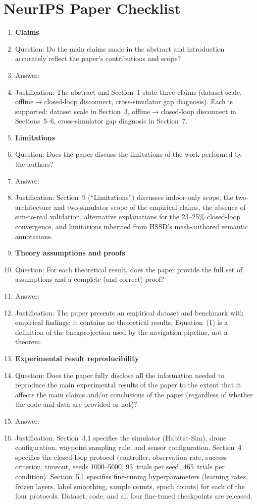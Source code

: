 \section*{NeurIPS Paper Checklist}

\begin{enumerate}

\item {\bf Claims}
    \item[] Question: Do the main claims made in the abstract and introduction accurately reflect the paper's contributions and scope?
    \item[] Answer: \answerYes{}
    \item[] Justification: The abstract and Section~1 state three claims (dataset scale, offline$\rightarrow$closed-loop disconnect, cross-simulator gap diagnosis). Each is supported: dataset scale in Section~3, offline$\rightarrow$closed-loop disconnect in Sections~5--6, cross-simulator gap diagnosis in Section~7.
\item {\bf Limitations}
    \item[] Question: Does the paper discuss the limitations of the work performed by the authors?
    \item[] Answer: \answerYes{}
    \item[] Justification: Section~9 (``Limitations'') discusses indoor-only scope, the two-architecture and two-simulator scope of the empirical claims, the absence of sim-to-real validation, alternative explanations for the 23--25\% closed-loop convergence, and limitations inherited from HSSD's mesh-authored semantic annotations.
\item {\bf Theory assumptions and proofs}
    \item[] Question: For each theoretical result, does the paper provide the full set of assumptions and a complete (and correct) proof?
    \item[] Answer: \answerNA{}
    \item[] Justification: The paper presents an empirical dataset and benchmark with empirical findings; it contains no theoretical results. Equation~(1) is a definition of the backprojection used by the navigation pipeline, not a theorem.
    \item {\bf Experimental result reproducibility}
    \item[] Question: Does the paper fully disclose all the information needed to reproduce the main experimental results of the paper to the extent that it affects the main claims and/or conclusions of the paper (regardless of whether the code and data are provided or not)?
    \item[] Answer: \answerYes{}
    \item[] Justification: Section~3.1 specifies the simulator (Habitat-Sim), drone configuration, waypoint sampling rule, and sensor configuration. Section~4 specifies the closed-loop protocol (controller, observation rate, success criterion, timeout, seeds 1000--5000, 93~trials per seed, 465~trials per condition). Section~5.1 specifies fine-tuning hyperparameters (learning rates, frozen layers, label smoothing, sample counts, epoch counts) for each of the four protocols. Dataset, code, and all four fine-tuned checkpoints are released.


\end{enumerate}
